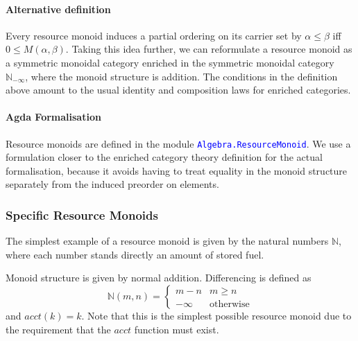 \documentclass[acmsmall,review,screen,anonymous]{acmart}
\newcommand{\natinf}{\mathbb{N}_{-\infty}}
\newcommand{\AgdaModule}[1]{\textcolor{blue}{\tt #1}}
\begin{document}
\paragraph{Alternative definition} Every resource monoid induces a
partial ordering on its carrier set by $\alpha \leq \beta$ iff
$0 \leq M(\alpha, \beta)$. Taking this idea further, we can
reformulate a resource monoid as a symmetric monoidal category
enriched in the symmetric monoidal category $\natinf$, where the
monoid structure is addition. The conditions in the definition above
amount to the usual identity and composition laws for enriched
categories.

\paragraph{Agda Formalisation} Resource monoids are defined in the
module \AgdaModule{Algebra.ResourceMonoid}. We use a formulation
closer to the enriched category theory definition for the actual
formalisation, because it avoids having to treat equality in the
monoid structure separately from the induced preorder on elements.

\subsubsection{Specific Resource Monoids}

The simplest example of a resource monoid is given by the natural
numbers $\mathbb{N}$, where each number stands directly an amount of
stored fuel.

\begin{definition}
  Monoid structure is given by normal addition. Differencing is
  defined as
  \begin{displaymath}
    \mathbb{N}(m,n) = \left\{
      \begin{array}{ll}
        m - n & m \geq n \\
        - \infty & \textrm{otherwise}
      \end{array}\right.
  \end{displaymath}
  and $\mathit{acct}(k) = k$. Note that this is the simplest possible
  resource monoid due to the requirement that the $\mathit{acct}$
  function must exist.
\end{definition}

\newcommand{\MaxPoly}{\mathrm{MaxPoly}}
\newcommand{\PlusPoly}{\mathrm{PlusPoly}}
\end{document}
